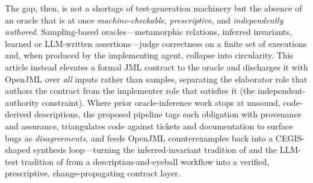 The gap, then, is not a shortage of test-generation machinery but the absence
of an oracle that is at once \emph{machine-checkable}, \emph{prescriptive}, and
\emph{independently authored}. Sampling-based oracles---metamorphic relations,
inferred invariants, learned or LLM-written assertions---judge correctness on a
finite set of executions and, when produced by the implementing agent,
collapse into circularity. This article instead elevates a formal JML contract
to the oracle and discharges it with OpenJML over \emph{all} inputs rather than
samples, separating the elaborator role that authors the contract from the
implementer role that satisfies it (the independent-authority constraint). Where
prior oracle-inference work stops at unsound, code-derived descriptions, the
proposed pipeline tags each obligation with provenance and assurance,
triangulates code against tickets and documentation to surface bugs as
\emph{disagreements}, and feeds OpenJML counterexamples back into a
CEGIS-shaped synthesis loop---turning the inferred-invariant tradition of
\citet{ernst2007daikon} and the LLM-test tradition of
\citet{schafer2024testpilot} from a description-and-eyeball workflow into a
verified, prescriptive, change-propagating contract layer.
